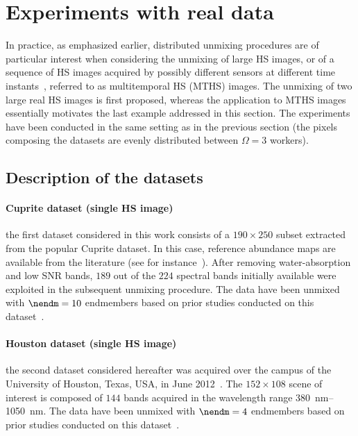 \documentclass[journal,final,letterpaper,twoside,twocolumn]{IEEEtran}
\begin{document}
\section{Experiments with real data} \label{sec:real_exp}

In practice, as emphasized earlier, distributed unmixing procedures are of particular interest when considering the unmixing of large HS images, or of a sequence of HS images acquired by possibly different sensors at different time instants~\cite{Henrot2016,Thouvenin2015b,Yokoya2017}, referred to as multitemporal HS (MTHS) images. The unmixing of two large real HS images is first proposed, whereas the application to MTHS images essentially motivates the last example addressed in this section. The experiments have been conducted in the same setting as in the previous section (the pixels composing the datasets are evenly distributed between $\Omega = 3$ workers).

	\subsection{Description of the datasets}

        \paragraph{Cuprite dataset (single HS image)}
the first dataset considered in this work consists of a $190 \times 250$ subset extracted from the popular Cuprite dataset. In this case, reference abundance maps are available from the literature (see for instance~\cite{Nascimento2005,Miao2007}). After removing water-absorption and low SNR bands, $189$ out of the $224$ spectral bands initially available were exploited in the subsequent unmixing procedure. The data have been unmixed with $\nendm = 10$ endmembers based on prior studies conducted on this dataset~\cite{Nascimento2005,Miao2007}.

        \paragraph{Houston dataset (single HS image)}
the second dataset considered hereafter was acquired over the campus of the University of Houston, Texas, USA, in June 2012~\cite{Debes2014}. The $152 \times 108$ scene of interest is composed of $144$ bands acquired in the wavelength range \SIrange{380}{1050}{\nano\metre}. The data have been unmixed with $\nendm = 4$ endmembers based on prior studies conducted on this dataset~\cite{Drumetz2016}.
\end{document}
